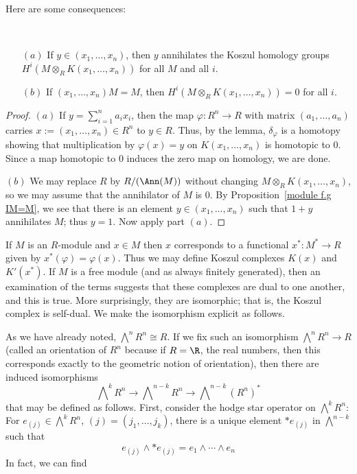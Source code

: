 Here are some consequences:
\begin{proposition}~\label{Koszul homotopy coro}
\mbox{}
\begin{itemize}
\item[$(a)$]If $y\in(x_1,\dots,x_n)$, then $y$ annihilates the Koszul homology groups $H^i(M\otimes_RK(x_1,\dots,x_n))$ for all $M$ and all $i$.
\item[$(b)$]If $(x_1,\dots,x_n)M=M$, then $H^i(M\otimes_RK(x_1,\dots,x_n))=0$ for all $i$.
\end{itemize}
\end{proposition}
\begin{proof}
$(a)$ If $y=\sum_{i=1}^{n}a_ix_i$, then the map $\varphi:R^n\to R$ with matrix $(a_1,\dots,a_n)$ carries $x:=(x_1,\dots,x_n)\in R^n$ to $y\in R$. Thus, by the lemma, $\delta_\varphi$ is a homotopy showing that multiplication by $\varphi(x)=y$ on $K(x_1,\dots,x_n)$ is homotopic to $0$. Since a map homotopic to $0$ induces the zero map on homology, we are done.\par
$(b)$ We may replace $R$ by $R/(\Ann(M))$ without changing $M\otimes_RK(x_1,\dots,x_n)$, so we may assume that the annihilator of $M$ is $0$. By Proposition~\ref{module f.g IM=M}, we see that there is an element $y\in(x_1,\dots,x_n)$ such that $1+y$ annihilates $M$; thus $y=1$. Now apply part $(a)$.
\end{proof}
If $M$ is an $R$-module and $x\in M$ then $x$ corresponds to a functional
$x^*:M^*\to R$ given by $x^*(\varphi)=\varphi(x)$. Thus we may define Koszul complexes $K(x)$ and $K'(x^*)$. If $M$ is a free module (and as always finitely generated), then an examination of the terms suggests that these complexes are dual to one another, and this is true. More surprisingly, they are isomorphic; that is, the Koszul complex is self-dual. We make the isomorphism explicit as follows.\par
As we have already noted, $\bigwedge^nR^n\cong R$. If we fix such an isomorphism $\bigwedge^nR^n\to R$ (called an orientation of $R^n$ because if $R=\R$, the real numbers, then this corresponds exactly to the geometric notion of orientation), then there are induced isomorphisms 
\[\bigwedge\nolimits^kR^n\to\bigwedge\nolimits^{n-k}R^n\to\bigwedge\nolimits^{n-k}(R^n)^*\] 
that may be defined as follows. First, consider the hodge star operator on $\bigwedge^kR^n$: For $e_{(j)}\in\bigwedge^kR^n$, $(j)=(j_1,\dots,j_k)$, there is a unique element $\ast e_{(j)}$ in $\bigwedge^{n-k}$ such that
\[e_{(j)}\wedge\ast e_{(j)}=e_1\wedge\cdots\wedge e_n\]
In fact, we can find 
